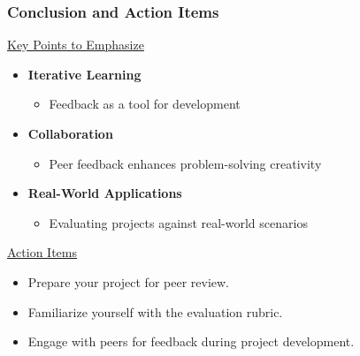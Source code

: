 \documentclass[aspectratio=169]{beamer}
\begin{document}
\begin{frame}[fragile]
  \frametitle{Conclusion and Action Items}
  
  \underline{Key Points to Emphasize}
  
  \begin{itemize}
    \item \textbf{Iterative Learning}
      \begin{itemize}
        \item Feedback as a tool for development
      \end{itemize}
    \item \textbf{Collaboration}
      \begin{itemize}
        \item Peer feedback enhances problem-solving creativity
      \end{itemize}
    \item \textbf{Real-World Applications}
      \begin{itemize}
        \item Evaluating projects against real-world scenarios
      \end{itemize}
  \end{itemize}

  \underline{Action Items}
  
  \begin{itemize}
    \item Prepare your project for peer review.
    \item Familiarize yourself with the evaluation rubric.
    \item Engage with peers for feedback during project development.
  \end{itemize}
\end{frame}
\end{document}
